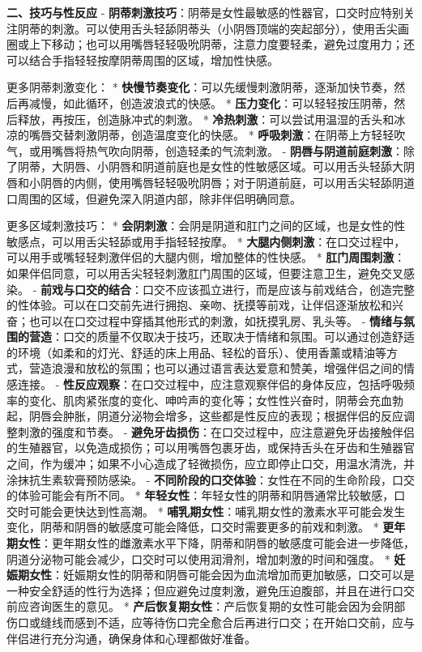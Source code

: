 \begin{enumerate}
  \textbf{二、技巧与性反应}
  - \textbf{阴蒂刺激技巧}：阴蒂是女性最敏感的性器官，口交时应特别关注阴蒂的刺激。可以使用舌头轻舔阴蒂头（小阴唇顶端的突起部分），使用舌尖画圈或上下移动；也可以用嘴唇轻轻吸吮阴蒂，注意力度要轻柔，避免过度用力；还可以结合手指轻轻按摩阴蒂周围的区域，增加性快感。\par
    更多阴蒂刺激变化：
    * \textbf{快慢节奏变化}：可以先缓慢刺激阴蒂，逐渐加快节奏，然后再减慢，如此循环，创造波浪式的快感。
    * \textbf{压力变化}：可以轻轻按压阴蒂，然后释放，再按压，创造脉冲式的刺激。
    * \textbf{冷热刺激}：可以尝试用温湿的舌头和冰凉的嘴唇交替刺激阴蒂，创造温度变化的快感。
    * \textbf{呼吸刺激}：在阴蒂上方轻轻吹气，或用嘴唇将热气吹向阴蒂，创造轻柔的气流刺激。
  - \textbf{阴唇与阴道前庭刺激}：除了阴蒂，大阴唇、小阴唇和阴道前庭也是女性的性敏感区域。可以用舌头轻舔大阴唇和小阴唇的内侧，使用嘴唇轻轻吸吮阴唇；对于阴道前庭，可以用舌尖轻舔阴道口周围的区域，但避免深入阴道内部，除非伴侣明确同意。\par
    更多区域刺激技巧：
    * \textbf{会阴刺激}：会阴是阴道和肛门之间的区域，也是女性的性敏感点，可以用舌尖轻舔或用手指轻轻按摩。
    * \textbf{大腿内侧刺激}：在口交过程中，可以用手或嘴轻轻刺激伴侣的大腿内侧，增加整体的性快感。
    * \textbf{肛门周围刺激}：如果伴侣同意，可以用舌尖轻轻刺激肛门周围的区域，但要注意卫生，避免交叉感染。
  - \textbf{前戏与口交的结合}：口交不应该孤立进行，而是应该与前戏结合，创造完整的性体验。可以在口交前先进行拥抱、亲吻、抚摸等前戏，让伴侣逐渐放松和兴奋；也可以在口交过程中穿插其他形式的刺激，如抚摸乳房、乳头等。
  - \textbf{情绪与氛围的营造}：口交的质量不仅取决于技巧，还取决于情绪和氛围。可以通过创造舒适的环境（如柔和的灯光、舒适的床上用品、轻松的音乐）、使用香薰或精油等方式，营造浪漫和放松的氛围；也可以通过语言表达爱意和赞美，增强伴侣之间的情感连接。
  - \textbf{性反应观察}：在口交过程中，应注意观察伴侣的身体反应，包括呼吸频率的变化、肌肉紧张度的变化、呻吟声的变化等；女性性兴奋时，阴蒂会充血勃起，阴唇会肿胀，阴道分泌物会增多，这些都是性反应的表现；根据伴侣的反应调整刺激的强度和节奏。
  - \textbf{避免牙齿损伤}：在口交过程中，应注意避免牙齿接触伴侣的生殖器官，以免造成损伤；可以用嘴唇包裹牙齿，或保持舌头在牙齿和生殖器官之间，作为缓冲；如果不小心造成了轻微损伤，应立即停止口交，用温水清洗，并涂抹抗生素软膏预防感染。
  - \textbf{不同阶段的口交体验}：女性在不同的生命阶段，口交的体验可能会有所不同。
    * \textbf{年轻女性}：年轻女性的阴蒂和阴唇通常比较敏感，口交时可能会更快达到性高潮。
    * \textbf{哺乳期女性}：哺乳期女性的激素水平可能会发生变化，阴蒂和阴唇的敏感度可能会降低，口交时需要更多的前戏和刺激。
    * \textbf{更年期女性}：更年期女性的雌激素水平下降，阴蒂和阴唇的敏感度可能会进一步降低，阴道分泌物可能会减少，口交时可以使用润滑剂，增加刺激的时间和强度。
    * \textbf{妊娠期女性}：妊娠期女性的阴蒂和阴唇可能会因为血流增加而更加敏感，口交可以是一种安全舒适的性行为选择；但应避免过度刺激，避免压迫腹部，并且在进行口交前应咨询医生的意见。
    * \textbf{产后恢复期女性}：产后恢复期的女性可能会因为会阴部伤口或缝线而感到不适，应等待伤口完全愈合后再进行口交；在开始口交前，应与伴侣进行充分沟通，确保身体和心理都做好准备。
  

\end{enumerate}
